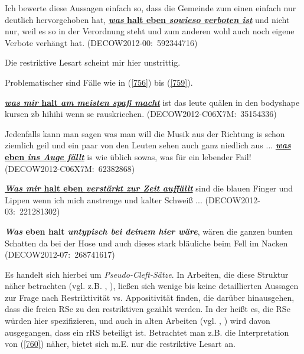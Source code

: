 \begin{exe}
	\ex\label{755} 
	\scriptsize
	Ich bewerte diese Aussagen einfach so, dass die Gemeinde zum einen einfach nur deutlich hervorgehoben hat, 						\underline{\textbf{\textit{was} halt eben \textit{sowieso verboten ist}}} und nicht nur, weil es so in der Verordnung steht 	und zum anderen wohl auch noch eigene Verbote verhängt hat. 
	\hfill\hbox{(DECOW2012-00: 592344716)}
\end{exe} 
Die restriktive Lesart scheint mir hier unstrittig.

Problematischer sind Fälle wie in (\ref{756}) bis (\ref{759}). 

\begin{exe}
	\ex\label{756} 
	\scriptsize
	\underline{\textbf{\textit{was mir} halt \textit{am meisten spaß macht}}} ist das leute quälen in den bodyshape kursen zb 			hihihi wenn se rauskriechen.                                                                            
	\hfill\hbox{(DECOW2012-C06X7M: 35154336)}
\end{exe} 

\begin{exe}
	\ex\label{757} 
	\scriptsize
	Jedenfalls kann man sagen was man will die Musik aus der Richtung is schon ziemlich geil und ein paar von den Leuten sehen 		auch ganz niedlich aus ... \underline{\textbf{\textit{was} eben \textit{ins Auge fällt}}} is wie üblich sowas, was für ein 		lebender Fail! 	                                                                            
	\hfill\hbox{(DECOW2012-C06X7M: 62382868)}
\end{exe} 	 
	
\begin{exe}
	\ex\label{758}
	\scriptsize 
	\underline{\textbf{\textit{Was mir} halt eben \textit{verstärkt zur Zeit auffällt}}} sind die blauen Finger und Lippen wenn 		ich mich anstrenge und kalter Schweiß ...  	                                                                            
	\hfill\hbox{(DECOW2012-03: 221281302)}
\end{exe} 				         
			       					                      
\begin{exe}
	\ex\label{759} 
	\scriptsize
	\textbf{\textit{Was} eben halt \textit{untypisch bei deinem hier wäre}}, wären die ganzen bunten Schatten da bei der Hose 			und auch dieses stark bläuliche beim Fell im Nacken	                                                                            
	\hfill\hbox{(DECOW2012-07: 268741617)}
\end{exe} 
 Es handelt sich hierbei um  \textit{Pseudo-Cleft-Sätze}. In Arbeiten, die diese Struktur näher betrachten (vgl. z.B. \citealt[360]{Lehmann1984}, \citealt[Kapitel 8]{Birkner2008}), ließen sich wenige bis keine detaillierten Aussagen zur Frage nach Restriktivität vs. Appositivität finden, die darüber hinausgehen, dass die freien RSe zu den restriktiven gezählt werden. In der \citet[1036]{Duden2009} heißt es, die RSe würden hier spezifizieren, und auch in alten Arbeiten (vgl. \citealt[95, 100]{Motsch1970}, \citealt[81]{Valgard1971}) wird davon ausgegangen, dass ein rRS beteiligt ist. Betrachtet man z.B. die Interpretation von (\ref{760}) näher, bietet sich m.E. nur die restriktive Lesart an.

